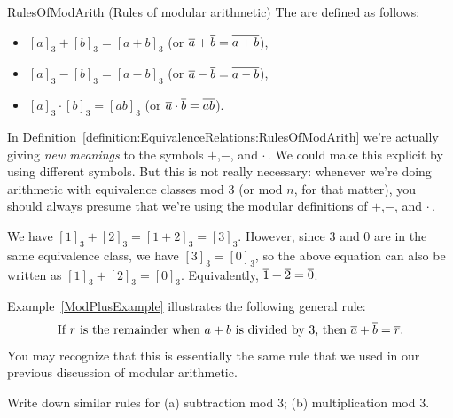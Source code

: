 \begin{defn}{RulesOfModArith} (Rules of modular arithmetic)
The  are defined as follows:
\begin{itemize}
\item $[a]_3 + [b]_3 = [a+b]_3$ \qquad (or $\overline{a} + \overline{b} = \overline{a + b}$),
\item $[a]_3 - [b]_3 = [a-b]_3$ \qquad (or $\overline{a} - \overline{b} = \overline{a - b}$),
\item $[a]_3 \cdot [b]_3 = [ab]_3$ \qquad (or $\overline{a} \cdot \overline{b} = \overline{a  b}$).
\end{itemize}
\end{defn}

In Definition~\ref{definition:EquivalenceRelations:RulesOfModArith} we're actually giving \emph{new meanings} to the symbols $+$,$-$, and $\cdot$\,. We could make this explicit by using different symbols. But this is not really necessary: whenever we're doing arithmetic with equivalence classes mod 3 (or mod $n$, for that matter), you should always presume that we're using the modular definitions of $+$,$-$, and $\cdot$\,.

\begin{eg}\label{ModPlusExample}
We have $[1]_3 + [2]_3 = [1 + 2]_3 = [3]_3$. However, since 3 and 0 are in the same equivalence class, we have $[3]_3 = [0]_3$, so the above equation can also be written as $[1]_3 + [2]_3 = [0]_3$. Equivalently, $\overline{1} + \overline{2} = \overline{0}$.
\end{eg}

Example~\ref{ModPlusExample} illustrates the following general rule:
$$ \text{%
 If $r$ is the remainder when $a + b$ is divided by $3$, then $\class{a} + \class{b} = \class{r}$.} $$
You may recognize that this is essentially the same rule that we used in our previous discussion of modular arithmetic.

\begin{exercise}{47}
Write down similar rules for (a) subtraction mod 3; (b) multiplication mod 3.
\end{exercise}

